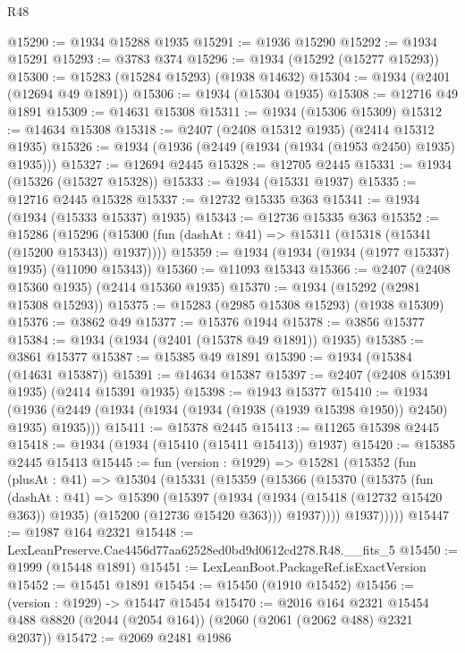 \begin{lexlean}{R48}
\begin{coremodule}
@15290 := @1934 @15288 @1935
@15291 := @1936 @15290
@15292 := @1934 @15291
@15293 := @3783 @374
@15296 := @1934 (@15292 (@15277 @15293))
@15300 := @15283 (@15284 @15293) (@1938 @14632)
@15304 := @1934 (@2401 (@12694 @49 @1891))
@15306 := @1934 (@15304 @1935)
@15308 := @12716 @49 @1891
@15309 := @14631 @15308
@15311 := @1934 (@15306 @15309)
@15312 := @14634 @15308
@15318 := @2407 (@2408 @15312 @1935) (@2414 @15312 @1935)
@15326 := @1934 (@1936 (@2449 (@1934 (@1934 (@1953 @2450) @1935) @1935)))
@15327 := @12694 @2445
@15328 := @12705 @2445
@15331 := @1934 (@15326 (@15327 @15328))
@15333 := @1934 (@15331 @1937)
@15335 := @12716 @2445 @15328
@15337 := @12732 @15335 @363
@15341 := @1934 (@1934 (@15333 @15337) @1935)
@15343 := @12736 @15335 @363
@15352 := @15286
    (@15296 (@15300 (fun (dashAt : @41) => @15311 (@15318 (@15341 (@15200 @15343)) @1937))))
@15359 := @1934 (@1934 (@1934 (@1977 @15337) @1935) (@11090 @15343))
@15360 := @11093 @15343
@15366 := @2407 (@2408 @15360 @1935) (@2414 @15360 @1935)
@15370 := @1934 (@15292 (@2981 @15308 @15293))
@15375 := @15283 (@2985 @15308 @15293) (@1938 @15309)
@15376 := @3862 @49
@15377 := @15376 @1944
@15378 := @3856 @15377
@15384 := @1934 (@1934 (@2401 (@15378 @49 @1891)) @1935)
@15385 := @3861 @15377
@15387 := @15385 @49 @1891
@15390 := @1934 (@15384 (@14631 @15387))
@15391 := @14634 @15387
@15397 := @2407 (@2408 @15391 @1935) (@2414 @15391 @1935)
@15398 := @1943 @15377
@15410 := @1934
    (@1936 (@2449 (@1934 (@1934 (@1934 (@1938 (@1939 @15398 @1950)) @2450) @1935) @1935)))
@15411 := @15378 @2445
@15413 := @11265 @15398 @2445
@15418 := @1934 (@1934 (@15410 (@15411 @15413)) @1937)
@15420 := @15385 @2445 @15413
@15445 := fun (version : @1929) =>
  @15281
    (@15352
      (fun (plusAt : @41) =>
      @15304
        (@15331
          (@15359
            (@15366
              (@15370
                (@15375
                  (fun (dashAt : @41) =>
                  @15390
                    (@15397
                      (@1934
                        (@1934 (@15418 (@12732 @15420 @363)) @1935)
                        (@15200 (@12736 @15420 @363)))
                      @1937))))
              @1937)))))
@15447 := @1987 @164 @2321
@15448 := LexLeanPreserve.Cae4456d77aa62528ed0bd9d0612cd278.R48.__fits_5
@15450 := @1999 (@15448 @1891)
@15451 := LexLeanBoot.PackageRef.isExactVersion
@15452 := @15451 @1891
@15454 := @15450 (@1910 @15452)
@15456 := (version : @1929) -> @15447 @15454
@15470 := @2016
    @164
    @2321
    @15454
    @488
    @8820
    (@2044 (@2054 @164))
    (@2060 (@2061 (@2062 @488) @2321 @2037))
@15472 := @2069 @2481 @1986

\end{coremodule}
\end{lexlean}
